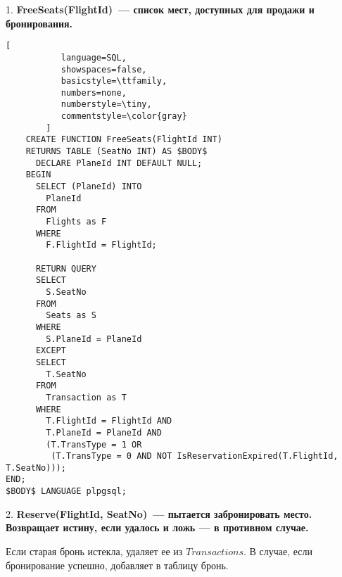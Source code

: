\documentclass[11pt,a4paper,oneside]{article}
\begin{document}
1. \textbf{FreeSeats(FlightId)~--- список мест, доступных для продажи и бронирования.}

\begin{lstlisting}[
           language=SQL,
           showspaces=false,
           basicstyle=\ttfamily,
           numbers=none,
           numberstyle=\tiny,
           commentstyle=\color{gray}
        ]
    CREATE FUNCTION FreeSeats(FlightId INT)
    RETURNS TABLE (SeatNo INT) AS $BODY$
      DECLARE PlaneId INT DEFAULT NULL;
    BEGIN
      SELECT (PlaneId) INTO
        PlaneId
      FROM 
        Flights as F
      WHERE
        F.FlightId = FlightId;

      RETURN QUERY
      SELECT
        S.SeatNo
      FROM
        Seats as S
      WHERE
        S.PlaneId = PlaneId
      EXCEPT
      SELECT
        T.SeatNo
      FROM 
        Transaction as T
      WHERE
        T.FlightId = FlightId AND
        T.PlaneId = PlaneId AND
        (T.TransType = 1 OR 
         (T.TransType = 0 AND NOT IsReservationExpired(T.FlightId, T.SeatNo)));
END;
$BODY$ LANGUAGE plpgsql;

\end{lstlisting}

2. \textbf{Reserve(FlightId, SeatNo)~--- пытается забронировать место. Возвращает истину, если удалось и ложь — в противном случае.}

Если старая бронь истекла, удаляет ее из $Transactions$. В случае, если бронирование успешно, добавляет в таблицу бронь.
\end{document}
